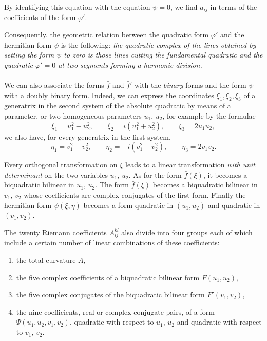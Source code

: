 \documentclass[leqno,12pt]{article}
\makeatletter
\let\old@phi\phi
\let\old@varphi\varphi
\let\phi\old@varphi
\let\varphi\old@phi
\theoremstyle{shape1}
\theoremstyle{shape0}
\theoremstyle{shape2}
\theoremstyle{definition}
\makeatother
\begin{document}
By identifying this equation with the equation $\psi=0$, we find $a_{ij}$ in terms of the coefficients of the form $\phi'$.

Consequently, the geometric relation between the quadratic form $\phi'$ and the hermitian form $\psi$ is the following: \emph{the quadratic complex of the lines obtained by setting the form $\psi$ to zero is those lines cutting the fundamental quadratic and the quadratic $\phi'=0$ at two segments forming a harmonic division.}

\paragraph{}
\label{sec:30}
We can also associate the forms $\bar f$ and $\bar f'$ with the \emph{binary} forms and the form $\psi$ with a doubly binary form. Indeed, we can express the coordinates $\xi_{1},\xi_{2},\xi_{3}$ of a generatrix in the second system of the absolute quadratic by means of a parameter, or two homogeneous parameters $u_{1}$, $u_{2}$, for example by the formulae
\[
\xi_{1}=u_{1}^{2}-u_{2}^{2},\qquad\xi_{2}=i(u_{1}^{2}+u_{2}^{2}),\qquad\xi_{3}=2u_{1}u_{2},
\]
we  also have, for every generatrix in the first system,
\[
\eta_{1}=v_{1}^{2}-v_{2}^{2},\qquad\eta_{2}=-i(v_{1}^{2}+v_{2}^{2}),\qquad\eta_{3}=2v_{1}v_{2}.
\]

Every orthogonal transformation on $\xi$ leads to a linear transformation \emph{with unit determinant} on the two variables $u_{1}$, $u_{2}$. As for the form $\bar f(\xi)$, it becomes a biquadratic bilinear in $u_{1}$, $u_{2}$. The form $\bar f(\xi)$ becomes a biquadratic bilinear in $v_{1}$, $v_{2}$ whose coefficients are complex conjugates of the first form. Finally the hermitian form $\psi(\xi,\eta)$ becomes a form quadratic in $(u_{1},u_{2})$ and quadratic in $(v_{1},v_{2})$.

The twenty Riemann coefficients $A^{kl}_{ij}$ also divide into four groups each of which include a certain number of linear combinations of these coefficients:
\begin{enumerate}
\item the total curvature $A$,
\item the five complex coefficients of a biquadratic bilinear form $F(u_{1},u_{2})$,
\item the five complex conjugates of the biquadratic bilinear form $F'(v_{1},v_{2})$,
\item the nine coefficients, real or complex conjugate pairs, of a form $\Psi(u_{1},u_{2},v_{1},v_{2})$, quadratic with respect to $u_{1}$, $u_{2}$ and quadratic with respect to $v_{1}$, $v_{2}$.
\end{enumerate}
\end{document}
